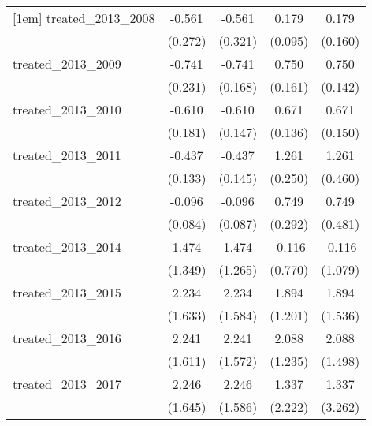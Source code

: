 {\begin{tabular}{l*{4}{c}}
[1em]
treated\_2013\_2008&      -0.561\sym{*}  &      -0.561         &       0.179         &       0.179         \\
            &     (0.272)         &     (0.321)         &     (0.095)         &     (0.160)         \\
[1em]
treated\_2013\_2009&      -0.741\sym{**} &      -0.741\sym{***}&       0.750\sym{***}&       0.750\sym{***}\\
            &     (0.231)         &     (0.168)         &     (0.161)         &     (0.142)         \\
[1em]
treated\_2013\_2010&      -0.610\sym{***}&      -0.610\sym{***}&       0.671\sym{***}&       0.671\sym{***}\\
            &     (0.181)         &     (0.147)         &     (0.136)         &     (0.150)         \\
[1em]
treated\_2013\_2011&      -0.437\sym{**} &      -0.437\sym{**} &       1.261\sym{***}&       1.261\sym{**} \\
            &     (0.133)         &     (0.145)         &     (0.250)         &     (0.460)         \\
[1em]
treated\_2013\_2012&      -0.096         &      -0.096         &       0.749\sym{*}  &       0.749         \\
            &     (0.084)         &     (0.087)         &     (0.292)         &     (0.481)         \\
[1em]
treated\_2013\_2014&       1.474         &       1.474         &      -0.116         &      -0.116         \\
            &     (1.349)         &     (1.265)         &     (0.770)         &     (1.079)         \\
[1em]
treated\_2013\_2015&       2.234         &       2.234         &       1.894         &       1.894         \\
            &     (1.633)         &     (1.584)         &     (1.201)         &     (1.536)         \\
[1em]
treated\_2013\_2016&       2.241         &       2.241         &       2.088         &       2.088         \\
            &     (1.611)         &     (1.572)         &     (1.235)         &     (1.498)         \\
[1em]
treated\_2013\_2017&       2.246         &       2.246         &       1.337         &       1.337         \\
            &     (1.645)         &     (1.586)         &     (2.222)         &     (3.262)         \\

\end{tabular}}
